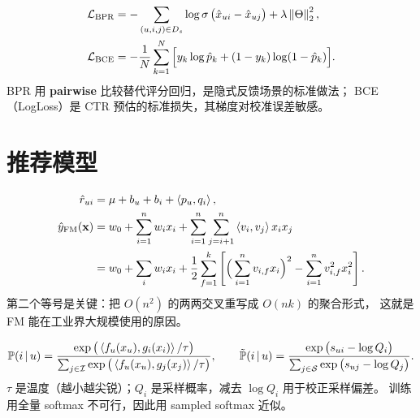 \begin{formulacard}
\begin{align}
\mathcal{L}_{\text{BPR}} &= -\sum_{(u,i,j) \in D_s} \log \operatorname{\sigma}\big(\hat{x}_{ui} - \hat{x}_{uj}\big) + \lambda \left\lVert \Theta \right\rVert_2^2 , \\
\mathcal{L}_{\text{BCE}} &= -\frac{1}{N}\sum_{k=1}^{N}\Big[ y_k \log \hat{p}_k + (1-y_k)\log(1-\hat{p}_k) \Big] .
\end{align}
BPR 用 \textbf{pairwise} 比较替代评分回归，是隐式反馈场景的标准做法；
BCE（LogLoss）是 CTR 预估的标准损失，其梯度对校准误差敏感。
\end{formulacard}

\section{推荐模型}

\begin{formulacard}
\begin{align}
\hat{r}_{ui} &= \mu + b_u + b_i + \left\langle p_u, q_i \right\rangle , \\
\hat{y}_{\text{FM}}(\mathbf{x}) &= w_0 + \sum_{i=1}^{n} w_i x_i
 + \sum_{i=1}^{n}\sum_{j=i+1}^{n} \left\langle v_i, v_j \right\rangle x_i x_j \notag \\
&= w_0 + \sum_i w_i x_i
 + \frac{1}{2}\sum_{f=1}^{k}\left[ \Big(\sum_{i=1}^{n} v_{i,f} x_i\Big)^2 - \sum_{i=1}^{n} v_{i,f}^2 x_i^2 \right] .
\end{align}
第二个等号是关键：把 $O(n^2)$ 的两两交叉重写成 $O(nk)$ 的聚合形式，
这就是 FM 能在工业界大规模使用的原因。
\end{formulacard}

\begin{formulacard}
\begin{equation}
\operatorname{\mathbb{P}}(i \,\vert\, u) = \frac{\exp\big(\left\langle f_u(x_u), g_i(x_i) \right\rangle / \tau\big)}
{\sum_{j \in \mathcal{I}} \exp\big(\left\langle f_u(x_u), g_j(x_j) \right\rangle / \tau\big)} ,
\qquad
\tilde{\operatorname{\mathbb{P}}}(i \,\vert\, u) = \frac{\exp\big(s_{ui} - \log Q_i\big)}
{\sum_{j \in \mathcal{S}} \exp\big(s_{uj} - \log Q_j\big)} .
\end{equation}
$\tau$ 是温度（越小越尖锐）；$Q_i$ 是采样概率，减去 $\log Q_i$ 用于校正采样偏差。
训练用全量 softmax 不可行，因此用 sampled softmax 近似。
\end{formulacard}

